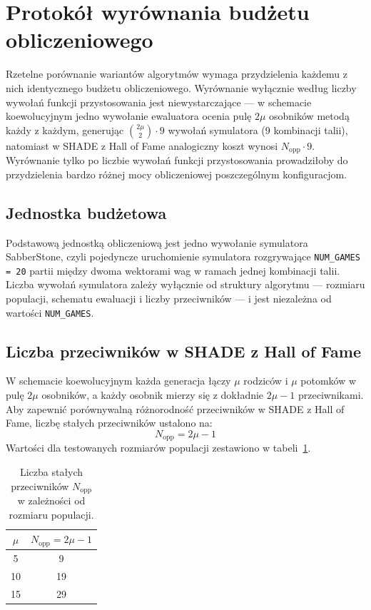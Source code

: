 \section{Protokół wyrównania budżetu obliczeniowego} \label{sec:budget}

Rzetelne porównanie wariantów algorytmów wymaga przydzielenia każdemu z nich identycznego budżetu obliczeniowego. Wyrównanie wyłącznie według liczby wywołań funkcji przystosowania jest niewystarczające --- w schemacie koewolucyjnym jedno wywołanie ewaluatora ocenia pulę $2\mu$ osobników metodą każdy z każdym, generując $\binom{2\mu}{2} \cdot 9$ wywołań symulatora (9 kombinacji talii), natomiast w SHADE z Hall of Fame analogiczny koszt wynosi $N_{\text{opp}} \cdot 9$. Wyrównanie tylko po liczbie wywołań funkcji przystosowania prowadziłoby do przydzielenia bardzo różnej mocy obliczeniowej poszczególnym konfiguracjom.

\subsection{Jednostka budżetowa}

Podstawową jednostką obliczeniową jest jedno wywołanie symulatora SabberStone, czyli pojedyncze uruchomienie symulatora rozgrywające \texttt{NUM\_GAMES = 20} partii między dwoma wektorami wag w ramach jednej kombinacji talii. Liczba wywołań symulatora zależy wyłącznie od struktury algorytmu --- rozmiaru populacji, schematu ewaluacji i liczby przeciwników --- i jest niezależna od wartości \texttt{NUM\_GAMES}.

\subsection{Liczba przeciwników w SHADE z Hall of Fame}

W schemacie koewolucyjnym każda generacja łączy $\mu$ rodziców i $\mu$ potomków w pulę $2\mu$ osobników, a każdy osobnik mierzy się z dokładnie $2\mu - 1$ przeciwnikami. Aby zapewnić porównywalną różnorodność przeciwników w SHADE z Hall of Fame, liczbę stałych przeciwników ustalono na:
\begin{equation}
    N_{\text{opp}} = 2\mu - 1
    \label{eq:nopp}
\end{equation}
Wartości dla testowanych rozmiarów populacji zestawiono w tabeli~\ref{tab:nopp}.

\begin{table}[h]
\centering
\caption{Liczba stałych przeciwników $N_{\text{opp}}$ w zależności od rozmiaru populacji.}
\label{tab:nopp}
\begin{tabular}{cc}
\toprule
$\mu$ & $N_{\text{opp}} = 2\mu - 1$ \\
\midrule
5  & 9  \\
10 & 19 \\
15 & 29 \\
\bottomrule
\end{tabular}
\end{table}

